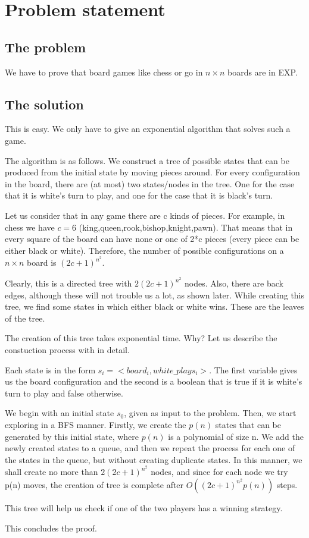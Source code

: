 \section*{Problem statement}
\subsection*{The problem}

We have to prove that board games like chess or go in $n \times n$ boards are in EXP.

\subsection*{The solution}

This is easy. We only have to give an exponential algorithm that solves such a 
game. 

The algorithm is as follows. We construct a tree of possible states
that can be produced from the initial state by moving pieces around. 
For every configuration in the board, there are (at most) two states/nodes in the
tree. One for the case that it is white's turn to play, and one for the 
case that it is black's turn. 

Let us consider that in any game there are c kinds of pieces. For example, in chess we have $c=6$ (king,queen,rook,bishop,knight,pawn). That means that in 
every square of the board can have none or one of 2*c pieces (every piece can 
be either black or white).  Therefore, the number of possible 
configurations on a $n \times n$ board is $(2c+1)^{n^2}$. 

Clearly, this is a directed tree with $2(2c+1)^{n^2}$ nodes. Also, there are back edges, although these will not trouble us a lot, as shown later. While 
creating this tree, we find some states in which either black or white 
wins. These are the leaves of the tree. 

The creation of this tree takes exponential time. Why? Let us describe the 
constuction process with in detail.

Each state is in the form $s_i= <board_i, white\_plays_i>$. The first variable gives us the board configuration and 
the second is a boolean that is true if it is white's turn to play and false otherwise. 

We begin with an initial state $s_0$, given as input to the problem. Then, we start exploring in a BFS manner. Firstly, we 
create the $p(n)$ states that can be generated by this initial state, where $p(n)$ is a polynomial of size n. We add the newly
created states to a queue, and then we repeat the process for each one of the states in the queue, but without creating 
duplicate states. In this manner, we shall create no more than $2(2c+1)^{n^2}$ nodes, and since for each node we 
try p(n) moves, the creation of tree is complete after $O((2c+1)^{n^2}p(n))$ steps.

This tree will help us check if one of the two players has a winning strategy.

This concludes the proof.

